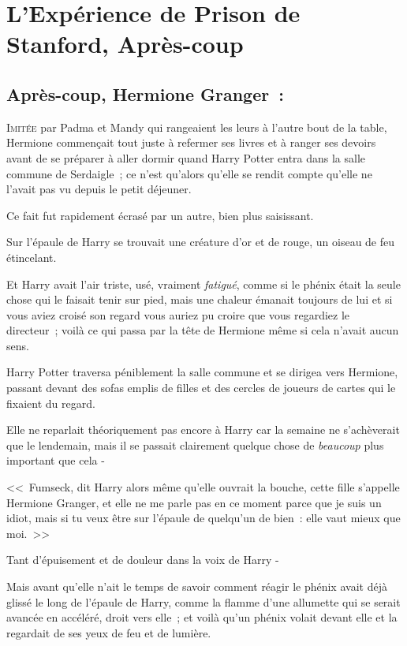 \chapter{L'Expérience de Prison de Stanford, Après-coup}

\section{Après-coup, Hermione Granger~:}

\lettrine{I}{mitée} par Padma et Mandy qui rangeaient les leurs à l'autre bout de la table, Hermione commençait tout juste à refermer ses livres et à ranger ses devoirs avant de se préparer à aller dormir quand Harry Potter entra dans la salle commune de Serdaigle~; ce n'est qu'alors qu'elle se rendit compte qu'elle ne l'avait pas vu depuis le petit déjeuner.

Ce fait fut rapidement écrasé par un autre, bien plus saisissant.

Sur l'épaule de Harry se trouvait une créature d'or et de rouge, un oiseau de feu étincelant.

Et Harry avait l'air triste, usé, vraiment \emph{fatigué}, comme si le phénix était la seule chose qui le faisait tenir sur pied, mais une chaleur émanait toujours de lui et si vous aviez croisé son regard vous auriez pu croire que vous regardiez le directeur~; voilà ce qui passa par la tête de Hermione même si cela n'avait aucun sens.

Harry Potter traversa péniblement la salle commune et se dirigea vers Hermione, passant devant des sofas emplis de filles et des cercles de joueurs de cartes qui le fixaient du regard.

Elle ne reparlait théoriquement pas encore à Harry car la semaine ne s'achèverait que le lendemain, mais il se passait clairement quelque chose de \emph{beaucoup} plus important que cela -

<<~Fumseck, dit Harry alors même qu'elle ouvrait la bouche, cette fille s'appelle Hermione Granger, et elle ne me parle pas en ce moment parce que je suis un idiot, mais si tu veux être sur l'épaule de quelqu'un de bien~: elle vaut mieux que moi.~>>

Tant d'épuisement et de douleur dans la voix de Harry -

Mais avant qu'elle n'ait le temps de savoir comment réagir le phénix avait déjà glissé le long de l'épaule de Harry, comme la flamme d'une allumette qui se serait avancée en accéléré, droit vers elle~; et voilà qu'un phénix volait devant elle et la regardait de ses yeux de feu et de lumière.

